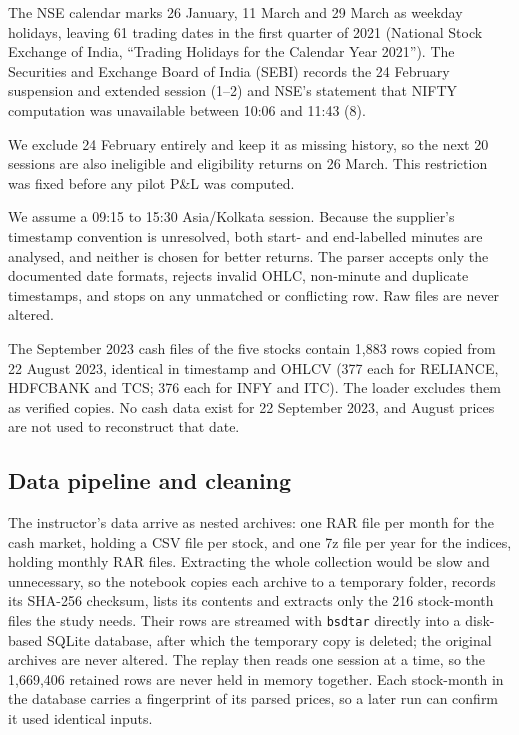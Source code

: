\documentclass[11pt,a4paper]{article}
\begin{document}
The NSE calendar marks 26 January, 11 March and 29 March as weekday holidays, leaving 61 trading dates in the first quarter of 2021 (National Stock Exchange of India, “Trading Holidays for the Calendar Year 2021”). The Securities and Exchange Board of India (SEBI) records the 24 February suspension and extended session (1--2) and NSE's statement that NIFTY computation was unavailable between 10:06 and 11:43 (8).

We exclude 24 February entirely and keep it as missing history, so the next 20 sessions are also ineligible and eligibility returns on 26 March. This restriction was fixed before any pilot P\&L was computed.

We assume a 09:15 to 15:30 Asia/Kolkata session. Because the supplier's timestamp convention is unresolved, both start- and end-labelled minutes are analysed, and neither is chosen for better returns. The parser accepts only the documented date formats, rejects invalid OHLC, non-minute and duplicate timestamps, and stops on any unmatched or conflicting row. Raw files are never altered.

The September 2023 cash files of the five stocks contain 1,883 rows copied from 22 August 2023, identical in timestamp and OHLCV (377 each for RELIANCE, HDFCBANK and TCS; 376 each for INFY and ITC). The loader excludes them as verified copies. No cash data exist for 22 September 2023, and August prices are not used to reconstruct that date.

\subsection*{Data pipeline and cleaning}

The instructor's data arrive as nested archives: one RAR file per month for the cash market, holding a CSV file per stock, and one 7z file per year for the indices, holding monthly RAR files. Extracting the whole collection would be slow and unnecessary, so the notebook copies each archive to a temporary folder, records its SHA-256 checksum, lists its contents and extracts only the 216 stock-month files the study needs. Their rows are streamed with \texttt{bsdtar} directly into a disk-based SQLite database, after which the temporary copy is deleted; the original archives are never altered. The replay then reads one session at a time, so the 1,669,406 retained rows are never held in memory together. Each stock-month in the database carries a fingerprint of its parsed prices, so a later run can confirm it used identical inputs.
\end{document}
